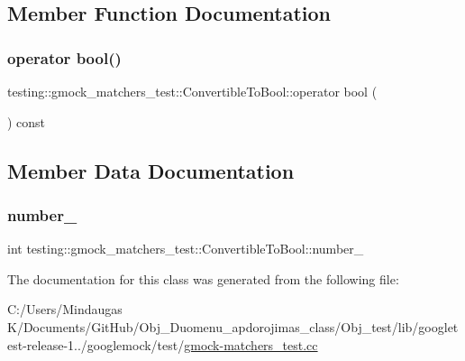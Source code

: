 \subsection{Member Function Documentation}
\mbox{\label{classtesting_1_1gmock__matchers__test_1_1_convertible_to_bool_a4ad9766b9d5179a1207af2449405f071}} 
\subsubsection{\texorpdfstring{operator bool()}{operator bool()}}
{\footnotesize\ttfamily testing\+::gmock\+\_\+matchers\+\_\+test\+::\+Convertible\+To\+Bool\+::operator bool (\begin{DoxyParamCaption}{ }\end{DoxyParamCaption}) const\hspace{0.3cm}{\ttfamily [inline]}}



\subsection{Member Data Documentation}
\mbox{\label{classtesting_1_1gmock__matchers__test_1_1_convertible_to_bool_ada38cee1b8eef8e499ec249711c4c6a6}} 
\subsubsection{\texorpdfstring{number\_}{number\_}}
{\footnotesize\ttfamily int testing\+::gmock\+\_\+matchers\+\_\+test\+::\+Convertible\+To\+Bool\+::number\+\_\+\hspace{0.3cm}{\ttfamily [private]}}



The documentation for this class was generated from the following file\+:\begin{DoxyCompactItemize}
\item 
C\+:/\+Users/\+Mindaugas K/\+Documents/\+Git\+Hub/\+Obj\+\_\+\+Duomenu\+\_\+apdorojimas\+\_\+class/\+Obj\+\_\+test/lib/googletest-\/release-\/1../googlemock/test/\mbox{\hyperlink{_obj__test_2lib_2googletest-release-1_88_81_2googlemock_2test_2gmock-matchers__test_8cc}{gmock-\/matchers\+\_\+test.\+cc}}\end{DoxyCompactItemize}

